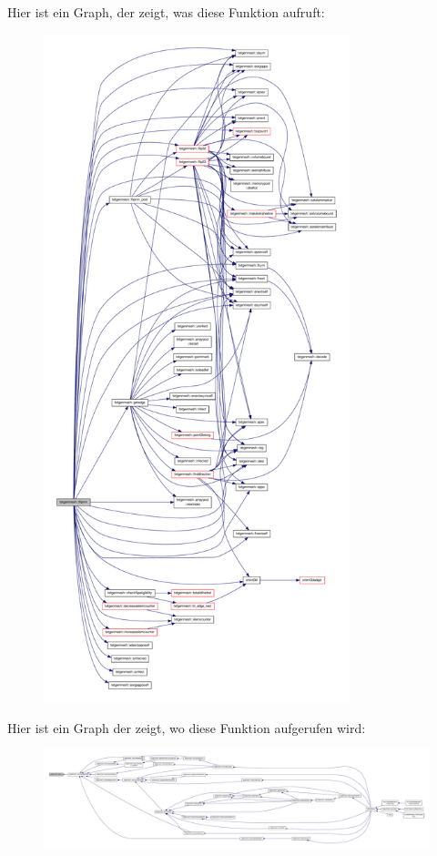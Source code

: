 Hier ist ein Graph, der zeigt, was diese Funktion aufruft\-:
\nopagebreak
\begin{figure}[H]
\begin{center}
\leavevmode
\includegraphics[height=550pt]{classtetgenmesh_aab593bf52c98bf0315b39afc65c06312_cgraph}
\end{center}
\end{figure}




Hier ist ein Graph der zeigt, wo diese Funktion aufgerufen wird\-:
\nopagebreak
\begin{figure}[H]
\begin{center}
\leavevmode
\includegraphics[width=350pt]{classtetgenmesh_aab593bf52c98bf0315b39afc65c06312_icgraph}
\end{center}
\end{figure}


